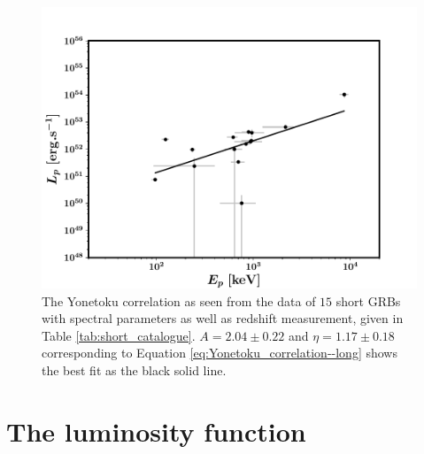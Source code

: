 \begin{figure}
\begin{center}
\includegraphics[scale=0.5]{L_vs_Ep0--correlations}
\caption[Yonetoku correlation for short GRBs]{The Yonetoku correlation as seen from the data of $15$ short GRBs with spectral parameters as well as redshift measurement, given in Table \ref{tab:short_catalogue}. $A = 2.04 \pm 0.22$ and $\eta = 1.17 \pm 0.18$ corresponding to Equation \ref{eq:Yonetoku_correlation--long} shows the best fit as the black solid line.}
\label{fig:Yonetoku_correlation--short}
\end{center}
\end{figure}


\section{The luminosity function}
\label{sec:luminosity_function--short}

